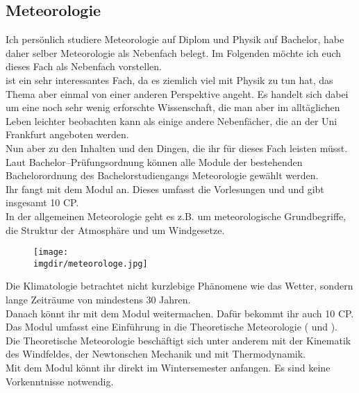 \subsection{Meteorologie}
\label{subsec:meteorologie}
Ich persönlich studiere Meteorologie auf Diplom und Physik auf Bachelor, habe daher selber Meteorologie als Nebenfach belegt. Im Folgenden möchte ich euch dieses Fach als Nebenfach vorstellen.\\
 ist ein sehr interessantes Fach, da es ziemlich viel mit Physik zu tun hat, das Thema aber einmal von einer anderen Perspektive angeht. Es handelt sich dabei um eine noch sehr wenig erforschte Wissenschaft, die man aber im alltäglichen Leben leichter beobachten kann als einige andere Nebenfächer, die an der Uni Frankfurt angeboten werden.\\
Nun aber zu den Inhalten und den Dingen, die ihr für dieses Fach leisten müsst.\\
Laut Bachelor--Prüfungsordnung können alle Module der bestehenden Bachelorordnung des Bachelorstudiengangs Meteorologie gewählt werden.\\
Ihr fangt mit dem Modul  an. Dieses umfasst die Vorlesungen  und  und gibt insgesamt 10 CP.\\
In der allgemeinen Meteorologie geht es z.B. um meteorologische Grundbegriffe, die Struktur der Atmosphäre und um Windgesetze.
\begin{figure}[!t]
  	\centering
  	\texttt{[image: \\imgdir/meteorologe.jpg]}
\end{figure}
\pagebreak
Die Klimatologie betrachtet nicht kurzlebige Phänomene wie das Wetter, sondern lange Zeiträume von mindestens 30 Jahren.\\
Danach könnt ihr mit dem Modul  weitermachen. Dafür bekommt ihr auch 10 CP.\\
Das Modul umfasst eine Einführung in die Theoretische Meteorologie ( und ).\\
Die Theoretische Meteorologie beschäftigt sich unter anderem mit der Kinematik des Windfeldes, der Newtonschen Mechanik und mit Thermodynamik.\\
Mit dem Modul  könnt ihr direkt im Wintersemester anfangen. Es sind keine Vorkenntnisse notwendig.
